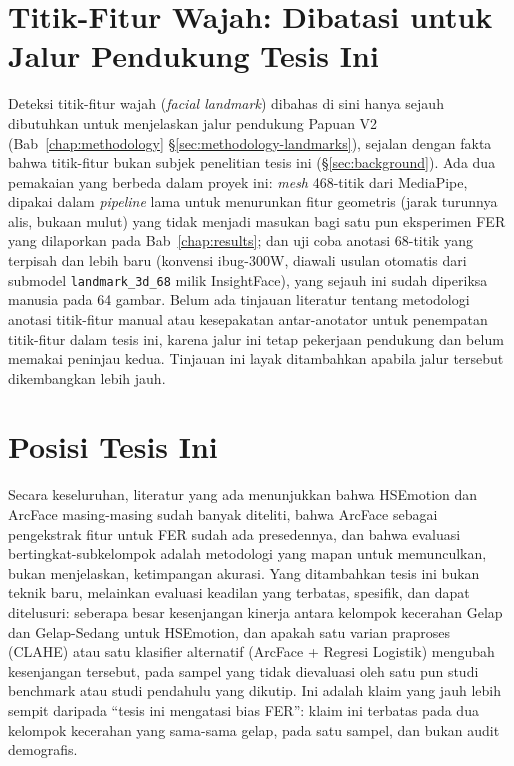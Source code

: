 \section{Titik-Fitur Wajah: Dibatasi untuk Jalur Pendukung Tesis Ini}

Deteksi titik-fitur wajah (\textit{facial landmark}) dibahas di sini hanya sejauh dibutuhkan untuk menjelaskan jalur pendukung Papuan V2 (Bab~\ref{chap:methodology} \S\ref{sec:methodology-landmarks}), sejalan dengan fakta bahwa titik-fitur bukan subjek penelitian tesis ini (\S\ref{sec:background}). Ada dua pemakaian yang berbeda dalam proyek ini: \textit{mesh} 468-titik dari MediaPipe, dipakai dalam \textit{pipeline} lama untuk menurunkan fitur geometris (jarak turunnya alis, bukaan mulut) yang tidak menjadi masukan bagi satu pun eksperimen FER yang dilaporkan pada Bab~\ref{chap:results}; dan uji coba anotasi 68-titik yang terpisah dan lebih baru (konvensi ibug-300W, diawali usulan otomatis dari submodel \texttt{landmark\_3d\_68} milik InsightFace), yang sejauh ini sudah diperiksa manusia pada 64 gambar. Belum ada tinjauan literatur tentang metodologi anotasi titik-fitur manual atau kesepakatan antar-anotator untuk penempatan titik-fitur dalam tesis ini, karena jalur ini tetap pekerjaan pendukung dan belum memakai peninjau kedua. Tinjauan ini layak ditambahkan apabila jalur tersebut dikembangkan lebih jauh.

\section{Posisi Tesis Ini}

Secara keseluruhan, literatur yang ada menunjukkan bahwa HSEmotion dan ArcFace masing-masing sudah banyak diteliti, bahwa ArcFace sebagai pengekstrak fitur untuk FER sudah ada presedennya, dan bahwa evaluasi bertingkat-subkelompok adalah metodologi yang mapan untuk memunculkan, bukan menjelaskan, ketimpangan akurasi. Yang ditambahkan tesis ini bukan teknik baru, melainkan evaluasi keadilan yang terbatas, spesifik, dan dapat ditelusuri: seberapa besar kesenjangan kinerja antara kelompok kecerahan Gelap dan Gelap-Sedang untuk HSEmotion, dan apakah satu varian praproses (CLAHE) atau satu klasifier alternatif (ArcFace + Regresi Logistik) mengubah kesenjangan tersebut, pada sampel yang tidak dievaluasi oleh satu pun studi benchmark atau studi pendahulu yang dikutip. Ini adalah klaim yang jauh lebih sempit daripada ``tesis ini mengatasi bias FER'': klaim ini terbatas pada dua kelompok kecerahan yang sama-sama gelap, pada satu sampel, dan bukan audit demografis.